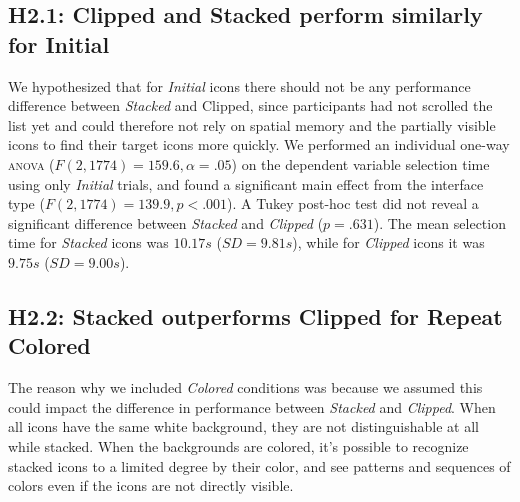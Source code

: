 \documentclass[nobib]{tufte-book} %
\begin{document}
\subsection{H2.1: Clipped and Stacked perform similarly for Initial}
We hypothesized that for \emph{Initial} icons there should not be any performance difference between \emph{Stacked} and Clipped, since participants had not scrolled the list yet and could therefore not rely on spatial memory and the partially visible icons to find their target icons more quickly. We performed an individual one-way \textsc{anova} ($F(2,1774) = 159.6, \alpha = .05$) on the dependent variable selection time using only \emph{Initial} trials, and found a significant main effect from the interface type ($F(2,1774) = 139.9, p < .001$).
A Tukey post-hoc test did not reveal a significant difference between \emph{Stacked} and \emph{Clipped} ($p = .631$). The mean selection time for \emph{Stacked} icons was $10.17 s$ ($SD = 9.81 s$), while for \emph{Clipped} icons it was $9.75 s$ ($SD = 9.00 s$).

\subsection{H2.2: Stacked outperforms Clipped for Repeat Colored}
The reason why we included \emph{Colored} conditions was because we assumed this could impact the difference in performance between \emph{Stacked} and \emph{Clipped}. When all icons have the same white background, they are not distinguishable at all while stacked. When the backgrounds are colored, it's possible to recognize stacked icons to a limited degree by their color, and see patterns and sequences of colors even if the icons are not directly visible.
\end{document}
